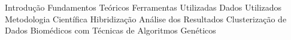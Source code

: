 \documentclass[engenhariaMecatronica]{UnB-CIC}%
\begin{document}
%
    		{Introdução}%
    		{Fundamentos Teóricos}%
    	{Ferramentas Utilizadas}%
    	{Dados Utilizados}%
    	{Metodologia Científica}%
    		{Hibridização}%
    	{Análise dos Resultados}%
    		{Clusterização de Dados Biomédicos com Técnicas de Algoritmos Genéticos}%
\end{document}
